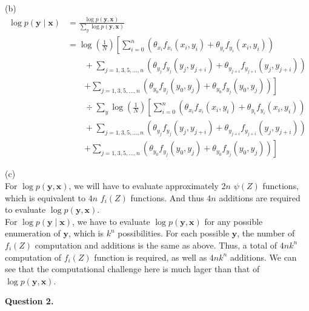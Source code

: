 \documentclass[11pt]{article}
\renewcommand{\vec}[1]{\mathbf{#1}}
\begin{document}
\newpage %
\begin{answertext}{20cm}{}

(b)
\begin{align*}
\log p(\vec{y}\mid\vec{x}) &= \frac{\log p(\vec{y}, \vec{x})}{\sum_{y} \log p(\vec{y}, \vec{x})} \\
& = \log \left( \frac{1}{N} \right) \left[ \sum_{i=0}^{n} \left( \theta_{x_{i}}f_{x_{i}}(x_{i}, y_{i}) + \theta_{y_{i}}f_{y_{i}}(x_{i}, y_{i}) \right) \right. \\
	&\qquad + \sum_{j = 1,3,5,\ldots,n} \left( \theta_{y_{j}}f_{y_{j}}(y_{j}, y_{j+i}) + \theta_{y_{j+i}}f_{y_{j+i}}(y_{j}, y_{j+i}) \right) \\
	&\qquad \left. + \sum_{j = 1,3,5,\ldots,n} \left( \theta_{y_{0}}f_{y_{j}}(y_{0}, y_{j}) + \theta_{y_{0}}f_{y_{j}}(y_{0}, y_{j}) \right) \right] \\
	&\qquad \div \sum_{y} \log \left( \frac{1}{N} \right) \left[ \sum_{i=0}^{n} \left( \theta_{x_{i}}f_{x_{i}}(x_{i}, y_{i}) + \theta_{y_{i}}f_{y_{i}}(x_{i}, y_{i}) \right) \right. \\
	&\qquad + \sum_{j = 1,3,5,\ldots,n} \left( \theta_{y_{j}}f_{y_{j}}(y_{j}, y_{j+i}) + \theta_{y_{j+i}}f_{y_{j+i}}(y_{j}, y_{j+i}) \right) \\
	&\qquad \left. + \sum_{j = 1,3,5,\ldots,n} \left( \theta_{y_{0}}f_{y_{j}}(y_{0}, y_{j}) + \theta_{y_{0}}f_{y_{j}}(y_{0}, y_{j}) \right) \right]
\end{align*}

(c) \\
For $\log p(\vec{y}, \vec{x})$, we will have to evaluate approximately $2n$ $\psi(Z)$ functions, which is equivalent to $4n$ $f_{i}(Z)$ functions. And thus $4n$ additions are required to evaluate $\log p(\vec{y}, \vec{x})$. \\
For $\log p(\vec{y}\mid\vec{x})$, we have to evaluate $\log p(\vec{y}, \vec{x})$ for any possible enumeration of $\vec{y}$, which is $k^{n}$ possibilities. For each possible $\vec{y}$, the number of $f_{i}(Z)$ computation and additions is the same as above. Thus, a total of $4nk^{n}$ computation of $f_{i}(Z)$ function is required, as well as $4nk^{n}$ additions. We can see that the computational challenge here is much lager than that of $\log p(\vec{y}, \vec{x})$.\\

\end{answertext} 

\pagebreak
{\bf Question 2.}
\end{document}
